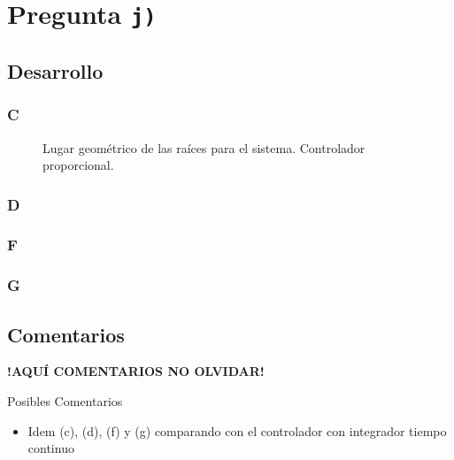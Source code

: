 \section{Pregunta \texttt{j)}}\label{pregunta-j}
\subsection{Desarrollo}

\subsubsection{C} %

\begin{figure}[ht]
  \centering
  
  \caption{Lugar geométrico de las raíces para el sistema. Controlador proporcional.}
  \label{fig:lgr-j}
\end{figure}

\FloatBarrier
\subsubsection{D}%


\FloatBarrier
\subsubsection{F}%

\FloatBarrier
\subsubsection{G}%


\FloatBarrier
\subsection{Comentarios}


\textbf{!AQUÍ COMENTARIOS NO OLVIDAR!}

Posibles Comentarios
\begin{itemize}
    \item Idem (c), (d), (f) y (g) comparando con el controlador con integrador tiempo continuo
\end{itemize}
